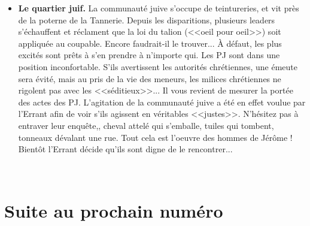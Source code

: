 \documentclass[11pt,twoside,a4paper]{book}
\begin{document}
\begin{itemize}
	\begin{itemize}
		\item[$\rightarrow$] Les PJ pourront aussi enqu{\^e}ter sur le meurtre d'Hakim, un n{\'e}gociant trouv{\'e} d{\'e}capit{\'e} dans son lit. Il tenait un commerce d'import-export florissant, et {\'e}tait notamment li{\'e} {\`a} J{\'e}r{\^o}me de Craonne. C'{\'e}tait un homme envi{\'e}, ne manquant pas d'ennemis (autant de fausses pistes). Il s'agissait surtout du <<fournisseur>> de jeunes femmes de J{\'e}r{\^o}me. Mais il a voulu faire chanter ce dernier, et la secte s'est charg{\'e}e de l'{\'e}lmiminer. La seule chose que les PJ peuvent trouver chez lui est une amulette en forme de faux. Un objet curieux, la faux n'{\'e}tant pas couramment utilis{\'e}e dans la r{\'e}gion.
	\end{itemize}
	\item \textbf{Le quartier juif. }La communaut{\'e} juive s'occupe de teintureries, et vit pr{\`e}s de la poterne de la Tannerie. Depuis les disparitions, plusieurs leaders s'{\'e}chauffent et r{\'e}clament que la loi du talion (<<oeil pour oeil>>) soit appliqu{\'e}e au coupable. Encore faudrait-il le trouver... {\`A} d{\'e}faut, les plus excit{\'e}s sont pr{\^e}ts {\`a} s'en prendre {\`a} n'importe qui. Les PJ sont dans une position inconfortable. S'ils avertissent les autorit{\'e}s chr{\'e}tiennes, une {\'e}meute sera {\'e}vit{\'e}, mais au pris de la vie des meneurs, les milices chr{\'e}tiennes ne rigolent pas avec les <<s{\'e}ditieux>>... Il vous revient de mesurer la port{\'e}e des actes des PJ. L'agitation de la communaut{\'e} juive a {\'e}t{\'e} en effet voulue par l'Errant afin de voir s'ils agissent en v{\'e}ritables <<justes>>. N'h{\'e}sitez pas {\`a} entraver leur enqu{\^e}te,, cheval attel{\'e} qui s'emballe, tuiles qui tombent, tonneaux d{\'e}valant une rue. Tout cela est l'oeuvre des hommes de J{\'e}r{\^o}me ! Bient{\^o}t l'Errant d{\'e}cide qu'ils sont digne de le rencontrer...
\end{itemize}~\\
\setlength\parindent{0pt}

\section*{Suite au prochain num{\'e}ro}
\end{document}
